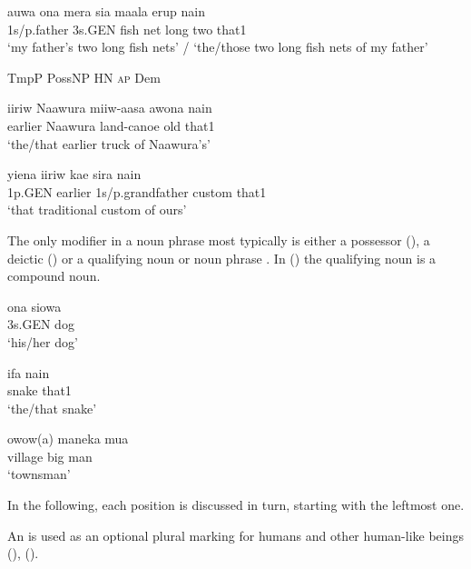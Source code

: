 \ea%
\label{ex:x392}
\gll auwa  ona  mera  sia  maala  erup  nain \\
1s/p.father  3s.GEN  fish  net  long  two  that1\\
\glt `my father's two long fish nets' / `the/those two long fish nets of my father'
\z



TmpP  PossNP  HN  \textsc{ap}  Dem

\ea%
\label{ex:x393}
\gll iiriw  Naawura  miiw-aasa  awona  nain \\
 earlier  Naawura  land-canoe  old  that1     \\
\glt`the/that earlier truck of Naawura's'
\z





\ea%
\label{ex:x394}
\gll yiena  iiriw  kae  sira  nain \\
   1p.GEN  earlier  1s/p.grandfather  custom  that1   \\
\glt`that traditional custom of ours'
\z





The only modifier in a noun phrase most typically is either a possessor (), a deictic () or a qualifying noun or noun phrase . In () the qualifying noun is a compound noun.

\ea%
\label{ex:x395}
\gll ona  siowa \\
 3s.GEN  dog     \\
\glt`his/her dog'

\z




\ea%
\label{ex:x396}
\gll ifa  nain \\
 snake  that1     \\
\glt`the/that snake'
\z





\ea%
\label{ex:x397}
\gll owow(a)  maneka  mua \\
 village  big  man     \\
\glt`townsman'
\z





In the following, each  position is discussed in turn, starting with the leftmost one.  

An  is used as an optional plural marking for humans and other human-like beings (), (). 

